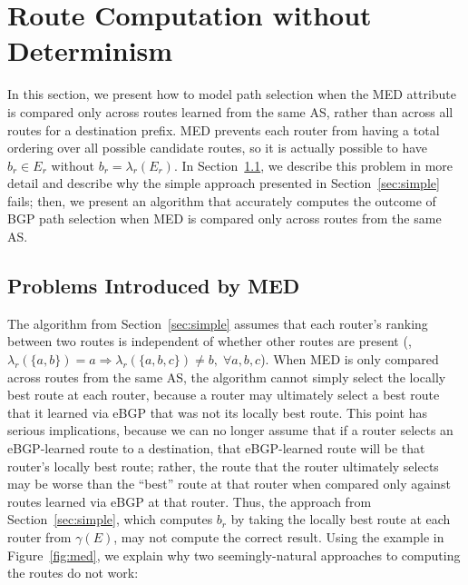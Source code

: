 %









\section{Route Computation without Determinism}\label{sec:med_model}

In this section, we present how to model path selection when the MED
attribute is compared only across routes learned from the same AS,
rather than across all routes for a destination prefix.  MED prevents
each router from having a total ordering over all possible candidate
routes, so it is actually possible to have $b_r \in E_r$ without $b_r =
\lambda_r(E_r)$.  In Section~\ref{sec:med}, we describe this problem in
more detail and describe why the simple approach presented in
Section~\ref{sec:simple} fails; then, we present an algorithm that
accurately computes the outcome of BGP path selection when MED is
compared only across routes from the same AS.

\subsection{Problems Introduced by MED}\label{sec:med}

The algorithm from Section~\ref{sec:simple} assumes that each router's
ranking between two routes is independent of whether other routes are
present (\ie, $\lambda_r(\{a,b\}) = a \Rightarrow \lambda_r(\{a,b,c\})
\neq b, \;\forall a,b,c$).  When MED is only compared across routes from
the same AS, the algorithm cannot simply select the locally best route
at each router, because a router may ultimately select a best route that
it learned via eBGP that was not its locally best route.
%
This point has serious implications, because we can no longer assume
that if a router selects an eBGP-learned route to a destination, that
eBGP-learned route will be that router's locally best route; rather, the
route that the router ultimately selects may be worse than the ``best''
route at that router when compared only against routes learned via eBGP
at that router.  Thus, the approach from Section~\ref{sec:simple}, which
computes $b_r$ by taking the locally best route at each router from
$\gamma(E)$, may not compute the correct result.  Using the example
in Figure~\ref{fig:med}, we explain why two seemingly-natural
approaches to computing the routes do not work:

